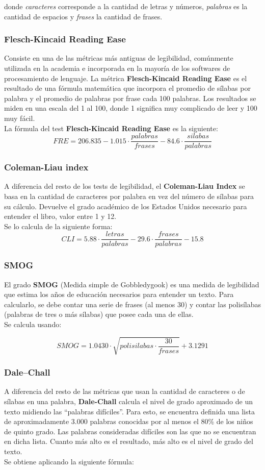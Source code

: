 \documentclass[12pt,journal,compsoc]{IEEEtran}
\begin{document}
donde \textit{caracteres} corresponde a la cantidad de letras y números, \textit{palabras} es la cantidad de espacios y \textit{frases} la cantidad de frases.

\subsubsection{Flesch-Kincaid Reading Ease}
Consiste en una de las métricas más antiguas de legibilidad, comúnmente utilizada en la academia e incorporada en la mayoría de los softwares de procesamiento de lenguaje. La métrica \textbf{Flesch-Kincaid Reading Ease} es el resultado de una fórmula matemática que incorpora el promedio de sílabas por palabra y el promedio de palabras por frase cada 100 palabras. Los resultados se miden en una escala del 1 al 100, donde 1 significa muy complicado de leer y 100 muy fácil.\\
La fórmula del test \textbf{Flesch-Kincaid Reading Ease} es la siguiente:
$$FRE = 206.835 - 1.015\cdot \frac{palabras}{frases} - 84.6\cdot \frac{silabas}{palabras}$$

\subsubsection{Coleman-Liau index}
A diferencia del resto de los tests de legibilidad, el \textbf{Coleman-Liau Index} se basa en la cantidad de caracteres por palabra en vez del número de sílabas para su cálculo. Devuelve el grado académico de los Estados Unidos necesario para entender el libro, valor entre 1 y 12.\\
Se lo calcula de la siguiente forma: 
$$CLI = 5.88 \cdot \frac{letras}{palabras} - 29.6 \cdot \frac{frases}{palabras} - 15.8$$

\subsubsection{SMOG}
El grado \textbf{SMOG} (Medida simple de Gobbledygook) es una medida de legibilidad que estima los años de educación necesarios para entender un texto. Para calcularlo, se debe contar una serie de frases (al menos 30) y contar las polisílabas (palabras de tres o más sílabas) que posee cada una de ellas.\\ 
Se calcula usando: 

$$SMOG = 1.0430\cdot \sqrt{polisilabas \cdot \frac{30}{frases}} + 3.1291$$

\subsubsection{Dale–Chall}
A diferencia del resto de las métricas que usan la cantidad de caracteres o de sílabas en una palabra, \textbf{Dale-Chall} calcula el nivel de grado aproximado de un texto midiendo las ``palabras difíciles''. Para esto, se encuentra definida una lista de aproximadamente 3.000 palabras conocidas por al menos el 80\% de los niños de quinto grado. Las palabras consideradas difíciles son las que no se encuentran en dicha lista. Cuanto más alto es el resultado, más alto es el nivel de grado del texto. 
\\Se obtiene aplicando la siguiente fórmula:
\end{document}
